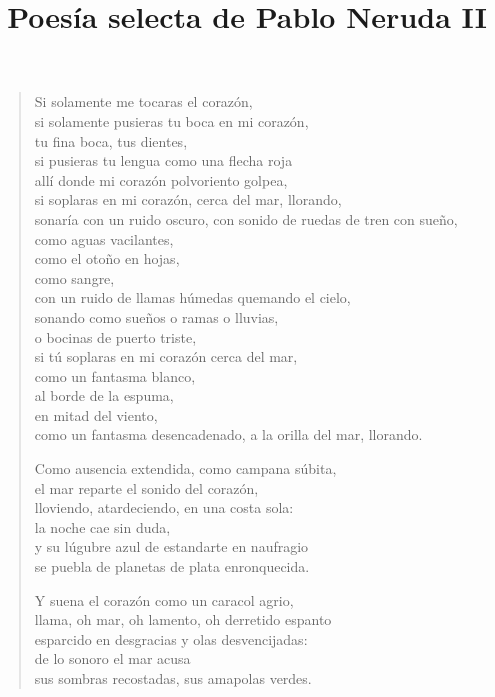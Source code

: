 \documentclass[12pt]{article}
\date{}
\title{Poesía selecta de Pablo Neruda II}
\begin{document}
\maketitle
\tableofcontents
\clearpage
{}
\begin{verse}

Si solamente me tocaras el corazón,\\
si solamente pusieras tu boca en mi corazón,\\
tu fina boca, tus dientes,\\
si pusieras tu lengua como una flecha roja\\
allí donde mi corazón polvoriento golpea,\\
si soplaras en mi corazón, cerca del mar, llorando,\\
sonaría con un ruido oscuro, con sonido de ruedas de tren con sueño,\\
como aguas vacilantes,\\
como el otoño en hojas,\\
como sangre,\\
con un ruido de llamas húmedas quemando el cielo,\\
sonando como sueños o ramas o lluvias,\\
o bocinas de puerto triste,\\
si tú soplaras en mi corazón cerca del mar,\\
como un fantasma blanco,\\
al borde de la espuma,\\
en mitad del viento,\\
como un fantasma desencadenado, a la orilla del mar, llorando.  

Como ausencia extendida, como campana súbita,\\
el mar reparte el sonido del corazón,\\
lloviendo, atardeciendo, en una costa sola:\\
la noche cae sin duda,\\
y su lúgubre azul de estandarte en naufragio\\
se puebla de planetas de plata enronquecida.  

Y suena el corazón como un caracol agrio,\\
llama, oh mar, oh lamento, oh derretido espanto\\
esparcido en desgracias y olas desvencijadas:\\
de lo sonoro el mar acusa\\
sus sombras recostadas, sus amapolas verdes.  


\end{verse}
\end{document}
